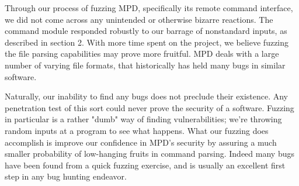\documentclass[10pt]{article}
\begin{document}
Through our process of fuzzing MPD, specifically its remote command interface, we did not come across any unintended or otherwise bizarre reactions. The command module responded robustly to our barrage of nonstandard inputs, as described in section 2. With more time spent on the project, we believe fuzzing the file parsing capabilities may prove more fruitful. MPD deals with a large number of varying file formats, that historically has held many bugs in similar software.

Naturally, our inability to find any bugs does not preclude their existence. Any penetration test of this sort could never prove the security of a software. Fuzzing in particular is a rather "dumb" way of finding vulnerabilities; we're throwing random inputs at a program to see what happens. What our fuzzing does accomplish is improve our confidence in MPD's security by assuring a much smaller probability of low-hanging fruits in command parsing. Indeed many bugs have been found from a quick fuzzing exercise, and is usually an excellent first step in any bug hunting endeavor.
\end{document}
